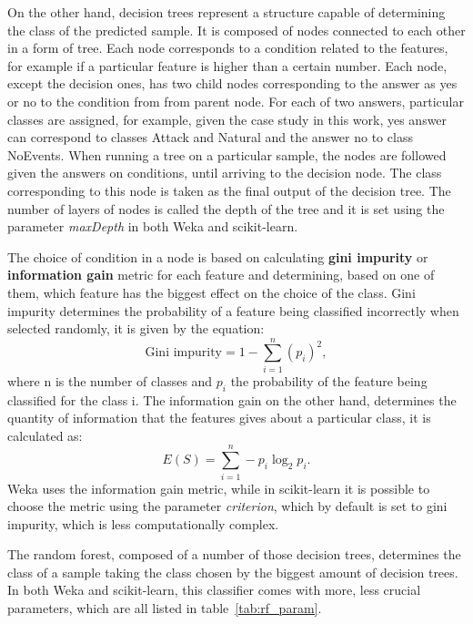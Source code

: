 On the other hand, decision trees represent a structure capable of determining the class of the predicted sample. It is composed of nodes connected to each other in a form of tree. Each node corresponds to a condition related to the features, for example if a particular feature is higher than a certain number. Each node, except the decision ones, has two child nodes corresponding to the answer as yes or no to the condition from from parent node. For each of two answers, particular classes are assigned, for example, given the case study in this work, yes answer can correspond to classes Attack and Natural and the answer no to class NoEvents. When running a tree on a particular sample, the nodes are followed given the answers on conditions, until arriving to the decision node. The class corresponding to this node is taken as the final output of the decision tree. The number of layers of nodes is called the depth of the tree and it is set using the parameter \textit{maxDepth} in both Weka and scikit-learn.

The choice of condition in a node is based on calculating \textbf{gini impurity} or \textbf{information gain} metric for each feature and determining, based on one of them, which feature has the biggest effect on the choice of the class. Gini impurity determines the probability of a feature being classified incorrectly when selected randomly, it is given by the equation:
\begin{equation}
    \text{Gini impurity} = 1 - \sum^n_{i=1} (p_i)^2,
\end{equation}
where n is the number of classes and $p_i$ the probability of the feature being classified for the class i. The information gain on the other hand, determines the quantity of information that the features gives about a particular class, it is calculated as:
\begin{equation}
    E(S) = \sum^n_{i=1} - p_i \log_2 p_i.
\end{equation}
Weka uses the information gain metric, while in scikit-learn it is possible to choose the metric using the parameter \textit{criterion}, which by default is set to gini impurity, which is less computationally complex.

The random forest, composed of a number of those decision trees, determines the class of a sample taking the class chosen by the biggest amount of decision trees. In both Weka and scikit-learn, this classifier comes with more, less crucial parameters, which are all listed in table~\ref{tab:rf_param}.

